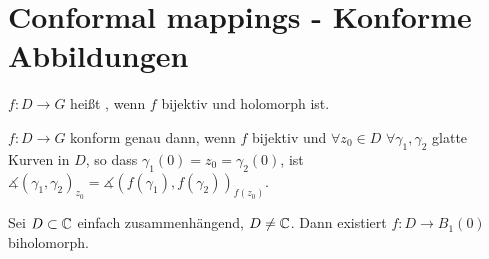\section{Conformal mappings - Konforme Abbildungen}
\begin{definition}
	$ f\colon D\rightarrow G $ hei\ss t , wenn $ f $ bijektiv und holomorph ist.
\end{definition}
\begin{definition}
	$ f\colon D\rightarrow G $ konform genau dann, wenn $ f $ bijektiv und $ \forall z_0\in D $ $ \forall\gamma_1,\gamma_2 $ glatte Kurven in $ D $, so dass $ \gamma_1(0)=z_0=\gamma_2(0) $, ist $ \measuredangle(\gamma_1,\gamma_2)_{z_0}=\measuredangle(f(\gamma_1),f(\gamma_2))_{f(z_0)} $.
\end{definition}
\begin{satz}
	Sei $ D\subset\mathbb{C} $ einfach zusammenh\"angend, $ D\neq\mathbb{C} $. Dann existiert $ f\colon D\rightarrow B_1(0) $ biholomorph.
\end{satz}